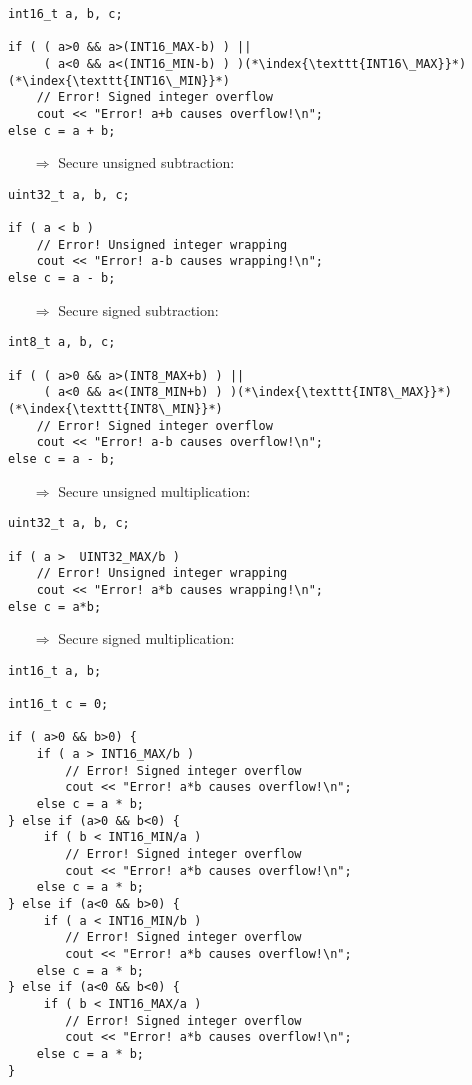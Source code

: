 \documentclass[10pt]{book}
\begin{document}
\begin{lstlisting}
int16_t a, b, c;

if ( ( a>0 && a>(INT16_MAX-b) ) ||
     ( a<0 && a<(INT16_MIN-b) ) )(*\index{\texttt{INT16\_MAX}}*)(*\index{\texttt{INT16\_MIN}}*)
    // Error! Signed integer overflow
    cout << "Error! a+b causes overflow!\n";
else c = a + b;
\end{lstlisting}
\begin{enumerate}
\item[$\Rightarrow$] Secure unsigned subtraction:
\end{enumerate}
\begin{lstlisting}
uint32_t a, b, c;

if ( a < b )
    // Error! Unsigned integer wrapping
    cout << "Error! a-b causes wrapping!\n";
else c = a - b;
\end{lstlisting}
\begin{enumerate}
\item[$\Rightarrow$] Secure signed subtraction:
\end{enumerate}
\begin{lstlisting}
int8_t a, b, c;

if ( ( a>0 && a>(INT8_MAX+b) ) ||
     ( a<0 && a<(INT8_MIN+b) ) )(*\index{\texttt{INT8\_MAX}}*)(*\index{\texttt{INT8\_MIN}}*)
    // Error! Signed integer overflow
    cout << "Error! a-b causes overflow!\n";
else c = a - b;
\end{lstlisting}
\begin{enumerate}
\item[$\Rightarrow$] Secure unsigned multiplication:
\end{enumerate}
\begin{lstlisting}
uint32_t a, b, c;

if ( a >  UINT32_MAX/b )
    // Error! Unsigned integer wrapping
    cout << "Error! a*b causes wrapping!\n";
else c = a*b;
\end{lstlisting}
\begin{enumerate}
\item[$\Rightarrow$] Secure signed multiplication:
\end{enumerate}
\begin{lstlisting}
int16_t a, b;

int16_t c = 0;

if ( a>0 && b>0) {
    if ( a > INT16_MAX/b )
        // Error! Signed integer overflow
        cout << "Error! a*b causes overflow!\n";
    else c = a * b;
} else if (a>0 && b<0) {
     if ( b < INT16_MIN/a )
        // Error! Signed integer overflow
        cout << "Error! a*b causes overflow!\n";
    else c = a * b;
} else if (a<0 && b>0) {
     if ( a < INT16_MIN/b )
        // Error! Signed integer overflow
        cout << "Error! a*b causes overflow!\n";
    else c = a * b;
} else if (a<0 && b<0) {
     if ( b < INT16_MAX/a )
        // Error! Signed integer overflow
        cout << "Error! a*b causes overflow!\n";
    else c = a * b;
}
\end{lstlisting}
\end{document}
